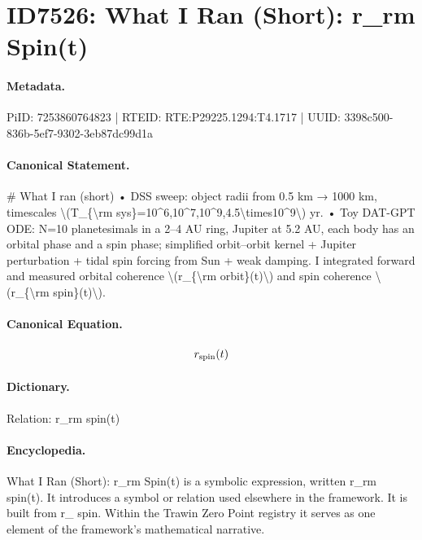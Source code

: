 \section*{ID7526: What I Ran (Short): r\_rm Spin(t)}
\paragraph{Metadata.}
PiID: 7253860764823 | RTEID: RTE:P29225.1294:T4.1717 | UUID: 3398c500-836b-5ef7-9302-3eb87dc99d1a

\paragraph{Canonical Statement.}
\# What I ran (short) • DSS sweep: object radii from 0.5 km → 1000 km, timescales \textbackslash{}(T\_\{\textbackslash{}rm sys\}=10\textasciicircum{}6,10\textasciicircum{}7,10\textasciicircum{}9,4.5\textbackslash{}times10\textasciicircum{}9\textbackslash{}) yr. • Toy DAT-GPT ODE: N=10 planetesimals in a 2–4 AU ring, Jupiter at 5.2 AU, each body has an orbital phase and a spin phase; simplified orbit–orbit kernel + Jupiter perturbation + tidal spin forcing from Sun + weak damping. I integrated forward and measured orbital coherence \textbackslash{}(r\_\{\textbackslash{}rm orbit\}(t)\textbackslash{}) and spin coherence \textbackslash{}(r\_\{\textbackslash{}rm spin\}(t)\textbackslash{}).

\paragraph{Canonical Equation.}
\[
r_{\rm spin}(t)
\]

\paragraph{Dictionary.}
Relation: r\_rm spin(t)

\paragraph{Encyclopedia.}
What I Ran (Short): r\_rm Spin(t) is a symbolic expression, written r\_rm spin(t). It introduces a symbol or relation used elsewhere in the framework. It is built from r\_ spin. Within the Trawin Zero Point registry it serves as one element of the framework's mathematical narrative.
